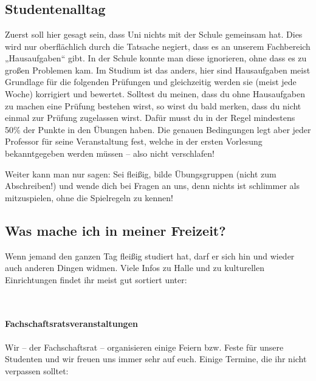 \\
\\
\\

\subsection{Studentenalltag}

Zuerst soll hier gesagt sein, dass Uni nichts mit der Schule gemeinsam hat.
Dies wird nur oberflächlich durch die Tatsache negiert, dass es an unserem Fachbereich „Hausaufgaben“ gibt.
In der Schule konnte man diese ignorieren, ohne dass es zu großen Problemen kam.
Im Studium ist das anders, hier sind Hausaufgaben meist Grundlage für die folgenden Prüfungen und gleichzeitig werden sie (meist jede Woche) korrigiert und bewertet.
Solltest du meinen, dass du ohne Hausaufgaben zu machen eine Prüfung bestehen wirst, so wirst du bald merken, dass du nicht einmal zur Prüfung zugelassen wirst.
Dafür musst du in der Regel mindestens 50\% der Punkte in den Übungen haben.
Die genauen Bedingungen legt aber jeder Professor für seine Veranstaltung fest, welche in der ersten Vorlesung bekanntgegeben werden müssen -- also nicht verschlafen!

Weiter kann man nur sagen: Sei fleißig, bilde Übungsgruppen (nicht zum Abschreiben!) und wende dich bei Fragen an uns, denn nichts ist schlimmer als mitzuspielen, ohne die Spielregeln zu kennen!

\subsection{Was mache ich in meiner Freizeit?}

Wenn jemand den ganzen Tag fleißig studiert hat, darf er sich hin und wieder auch anderen Dingen widmen.
Viele Infos zu Halle und zu kulturellen Einrichtungen findet ihr meist gut sortiert unter:

\\

\paragraph{Fachschaftsratsveranstaltungen}
Wir -- der Fachschaftsrat -- organisieren einige Feiern bzw. Feste für unsere Studenten und wir freuen uns immer sehr auf euch.
Einige Termine, die ihr nicht verpassen solltet:

